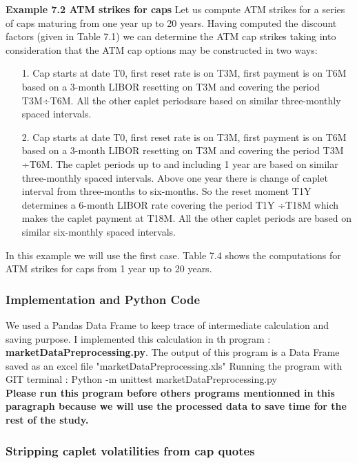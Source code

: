 \documentclass[11pt]{article}
\numberwithin{equation}{subsection}
\begin{document}
\textbf{Example 7.2 ATM strikes for caps}
Let us compute ATM strikes for a series of caps maturing from one year up to 20
years. Having computed the discount factors (given in Table 7.1) we can determine the ATM cap strikes taking into consideration that the ATM cap options may be constructed in two ways:

\begin{enumerate}
	\item [1.] Cap starts at date T0, first reset rate is on T3M, first payment is on T6M based on a 3-month
	LIBOR resetting on T3M and covering the period T3M÷T6M. All the other caplet periodsare based on similar three-monthly spaced intervals.
	\item [2.] Cap starts at date T0, first reset rate is on T3M, first payment is on T6M based on a 3-month LIBOR resetting on T3M and covering the period T3M ÷T6M. The caplet periods up to and including 1 year are based on similar three-monthly spaced intervals. Above one year there is change of caplet interval from three-months to six-months. So the reset moment T1Y determines a 6-month LIBOR rate covering the period T1Y ÷T18M which makes the caplet payment at T18M. All the other caplet periods are based on similar six-monthly spaced intervals.
\end{enumerate}

In this example we will use the first case.
Table 7.4 shows the computations for ATM strikes for caps from 1 year up to 20 years.

\subsubsection{Implementation and Python Code}
We used a Pandas Data Frame to keep trace of intermediate calculation and saving purpose. I implemented this calculation in th program : \textbf{marketDataPreprocessing.py}. The output of this program is a Data Frame saved as an excel file "marketDataPreprocessing.xls" 
Running the program with GIT terminal  : Python -m unittest marketDataPreprocessing.py\\
\textbf{Please run this program before others programs mentionned in this paragraph because we will use the processed data to save time for the rest of the study.}

\subsubsection{Stripping caplet volatilities from cap quotes}
\end{document}

